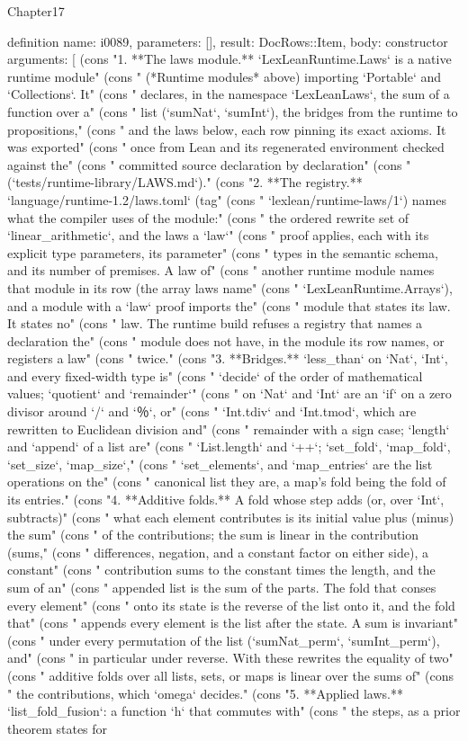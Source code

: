 \begin{lexlean}{Chapter17}
\begin{semanticmodule}
definition{
  name: i0089,
  parameters: [],
  result: DocRows::Item,
  body: constructor{
    arguments: [
      (cons "1. **The laws module.** `LexLeanRuntime.Laws` is a native runtime module" (cons "   (*Runtime modules* above) importing `Portable` and `Collections`. It" (cons "   declares, in the namespace `LexLeanLaws`, the sum of a function over a" (cons "   list (`sumNat`, `sumInt`), the bridges from the runtime to propositions," (cons "   and the laws below, each row pinning its exact axioms. It was exported" (cons "   once from Lean and its regenerated environment checked against the" (cons "   committed source declaration by declaration" (cons "   (`tests/runtime-library/LAWS.md`)." (cons "2. **The registry.** `language/runtime-1.2/laws.toml` (tag" (cons "   `lexlean/runtime-laws/1`) names what the compiler uses of the module:" (cons "   the ordered rewrite set of `linear_arithmetic`, and the laws a `law`" (cons "   proof applies, each with its explicit type parameters, its parameter" (cons "   types in the semantic schema, and its number of premises. A law of" (cons "   another runtime module names that module in its row (the array laws name" (cons "   `LexLeanRuntime.Arrays`), and a module with a `law` proof imports the" (cons "   module that states its law. It states no" (cons "   law. The runtime build refuses a registry that names a declaration the" (cons "   module does not have, in the module its row names, or registers a law" (cons "   twice." (cons "3. **Bridges.** `less_than` on `Nat`, `Int`, and every fixed-width type is" (cons "   `decide` of the order of mathematical values; `quotient` and `remainder`" (cons "   on `Nat` and `Int` are an `if` on a zero divisor around `/` and `％`, or" (cons "   `Int.tdiv` and `Int.tmod`, which are rewritten to Euclidean division and" (cons "   remainder with a sign case; `length` and `append` of a list are" (cons "   `List.length` and `++`; `set_fold`, `map_fold`, `set_size`, `map_size`," (cons "   `set_elements`, and `map_entries` are the list operations on the" (cons "   canonical list they are, a map's fold being the fold of its entries." (cons "4. **Additive folds.** A fold whose step adds (or, over `Int`, subtracts)" (cons "   what each element contributes is its initial value plus (minus) the sum" (cons "   of the contributions; the sum is linear in the contribution (sums," (cons "   differences, negation, and a constant factor on either side), a constant" (cons "   contribution sums to the constant times the length, and the sum of an" (cons "   appended list is the sum of the parts. The fold that conses every element" (cons "   onto its state is the reverse of the list onto it, and the fold that" (cons "   appends every element is the list after the state. A sum is invariant" (cons "   under every permutation of the list (`sumNat_perm`, `sumInt_perm`), and" (cons "   in particular under reverse. With these rewrites the equality of two" (cons "   additive folds over all lists, sets, or maps is linear over the sums of" (cons "   the contributions, which `omega` decides." (cons "5. **Applied laws.** `list_fold_fusion`: a function `h` that commutes with" (cons "   the steps, as a prior theorem states for }}
\end{semanticmodule}
\end{lexlean}
